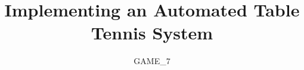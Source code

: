 \documentclass[11pt,a4paper,twocolumn]{report}
\title{Implementing an Automated Table Tennis System}
\subtitle{GAME\_7}
\begin{document}
	\preface
	
	
	
	
	
	

	
	



%	

	\backcover
\end{document}
